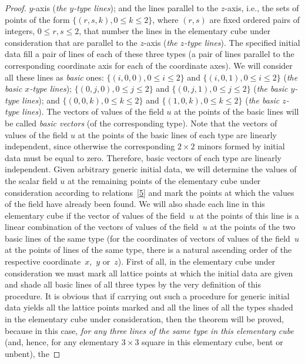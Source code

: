 \documentclass[11pt]{article}
\begin{document}
\begin{proof}
$y$-axis ({\it the $y$-type lines}); and the lines parallel to the
$z$-axis, i.e., the sets of points of the form $\{(r, s, k), 0 \leq
k \leq 2\}$, where $(r, s)$ are f\/ixed ordered pairs of integers, $0
\leq r, s \leq 2$, that number the lines in the elementary cube
under consideration that are parallel to the $z$-axis ({\it the
$z$-type lines}). The specif\/ied initial data f\/ill a pair of lines of
each of these three types (a pair of lines parallel to the
corresponding coordinate axis for each of the coordinate axes). We
will consider all these lines as {\it basic} ones: $\{(i, 0, 0), 0
\leq i \leq 2\}$ and $\{(i, 0, 1), 0 \leq i \leq 2\}$ ({\it the
basic $x$-type lines}); $\{(0, j, 0), 0 \leq j \leq 2\}$ and $\{(0,
j, 1), 0 \leq j \leq 2\}$ ({\it the basic $y$-type lines}); and
$\{(0, 0, k), 0 \leq k \leq 2\}$ and $\{(1, 0, k), 0 \leq k \leq
2\}$ ({\it the basic $z$-type lines}). The vectors of values of the
f\/ield $u$ at the points of the basic lines will be called {\it basic
vectors} (of the corresponding type). Note that the vectors of
values of the f\/ield $u$ at the points of the basic lines of each
type are linearly independent, since otherwise the corresponding $2
\times 2$ minors formed by initial data must be equal to zero.
Therefore, basic vectors of each type are linearly independent.
Given arbitrary generic initial data, we will determine the values
of the scalar f\/ield $u$ at the remaining points of the elementary
cube under consideration according to relations~\eqref{5} and mark
the points at which the values of the f\/ield have already been found.
We will also shade each line in this elementary cube if the vector
of values of the f\/ield~$u$ at the points of this line is a linear
combination of the vectors of values of the f\/ield~$u$ at the points
of the two basic lines of the same type (for the coordinates of
vectors of values of the f\/ield~$u$ at the points of lines of the
same type, there is a natural ascending order of the respective
coordinate~$x$,~$y$ or~$z$). First of all, in the elementary cube
under consideration we must mark all lattice points at which the
initial data are given and shade all basic lines of all three types
by the very def\/inition of this procedure. It is obvious that if
carrying out such a procedure for generic initial data yields all
the lattice points marked and all the lines of all the types shaded
in the elementary cube under consideration, then the theorem will be
proved, because in this case, {\it for any three lines of the same
type in this elementary cube} (and, hence, for any elementary $3
\times 3$ square in this elementary cube, bent or unbent), the

\end{proof}
\end{document}

